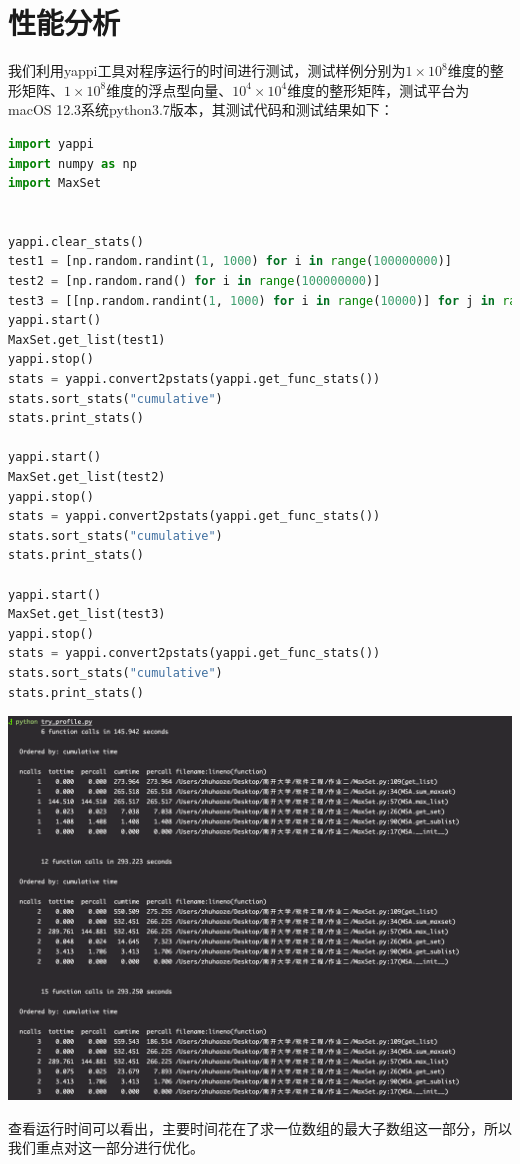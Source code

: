 \documentclass{article}
\begin{document}
\section{性能分析}
我们利用yappi工具对程序运行的时间进行测试，测试样例分别为$1\times 10^8$维度的整形矩阵、$1\times 10^8$维度的浮点型向量、$10^4\times 10^4$维度的整形矩阵，测试平台为macOS 12.3系统python3.7版本，其测试代码和测试结果如下：
\begin{lstlisting}[language = Python]
import yappi
import numpy as np
import MaxSet


yappi.clear_stats()
test1 = [np.random.randint(1, 1000) for i in range(100000000)]
test2 = [np.random.rand() for i in range(100000000)]
test3 = [[np.random.randint(1, 1000) for i in range(10000)] for j in range(10000)]
yappi.start()
MaxSet.get_list(test1)
yappi.stop()
stats = yappi.convert2pstats(yappi.get_func_stats())
stats.sort_stats("cumulative")
stats.print_stats()

yappi.start()
MaxSet.get_list(test2)
yappi.stop()
stats = yappi.convert2pstats(yappi.get_func_stats())
stats.sort_stats("cumulative")
stats.print_stats()

yappi.start()
MaxSet.get_list(test3)
yappi.stop()
stats = yappi.convert2pstats(yappi.get_func_stats())
stats.sort_stats("cumulative")
stats.print_stats()
\end{lstlisting}
\begin{center}
   \includegraphics[scale = 0.4]{2.png}
\end{center}
\par 查看运行时间可以看出，主要时间花在了求一位数组的最大子数组这一部分，所以我们重点对这一部分进行优化。
\end{document}
